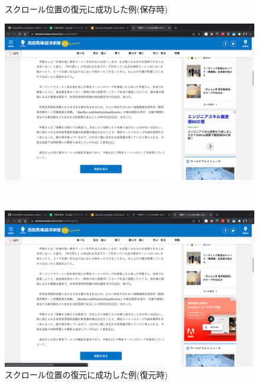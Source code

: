 \begin{figure}[htbp]
  \begin{minipage}[t]{\hsize}
    \caption{スクロール位置の復元に成功した例(保存時)}
    \label{fig:success-example-scroll-position-before}
    \begin{center}
      \includegraphics[bb=0 0 2880 1800,width=15cm]{img/060_evaluation/result/scroll_position/success-example-scroll-position-before.pdf}
    \end{center}
  \end{minipage} \\

  \begin{minipage}[t]{\hsize}
    \caption{スクロール位置の復元に成功した例(復元時)}
    \label{fig:success-example-scroll-position-after}
    \begin{center}
      \includegraphics[bb=0 0 2880 1800,width=15cm]{img/060_evaluation/result/scroll_position/success-example-scroll-position-after.pdf}
    \end{center}
  \end{minipage}
\end{figure}

